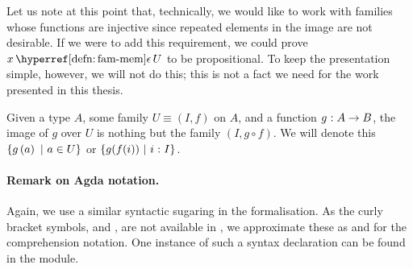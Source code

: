 Let us note at this point that, technically, we would like to work with families whose
functions are injective since repeated elements in the image are not desirable. If we were
to add this requirement, we could prove $\memfam{x}{U}$ to be propositional. To keep the
presentation simple, however, we will not do this; this is not a fact we need for the work
presented in this thesis.

\begin{defn}\label{defn:fam-img}
  Given a type $A$, some family $U \equiv (I, f)$ on $A$, and a function $g\hspace{0.1mm}:\hspace{0.1mm}A \rightarrow B$,
  the image of $g$ over $U$ is nothing but the family $(I, g \circ f)$. We will denote this
  $\left\{  g\left( a \right) ~|~ a \in U  \right\}$ or $\left\{  g(f(i)) ~|~ i\hspace{0.1mm}:\hspace{0.1mm}I  \right\}$.
\end{defn}

\paragraph*{Remark on Agda notation.}
Again, we use a similar syntactic sugaring in the \veragda{} formalisation. As the curly
bracket symbols, \fnname{\{} and \fnname{\}}, are not available in \veragda{}, we
approximate these as \fnname{\textlquill} and \fnname{\textrquill} for the comprehension notation. One
instance of such a syntax declaration can be found in the  module.

